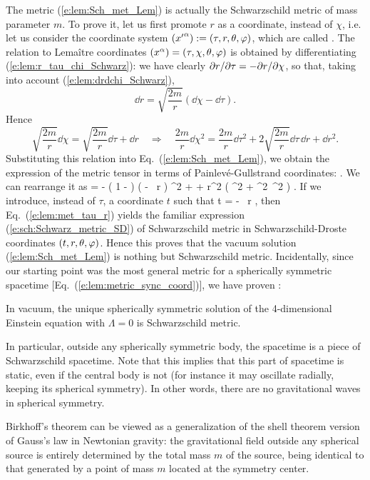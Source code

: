 The metric (\ref{e:lem:Sch_met_Lem}) is actually the
Schwarzschild metric of mass parameter $m$. To prove it, let us first
promote $r$ as a coordinate, instead of $\chi$, i.e. let us consider the
coordinate system $({x'}^\alpha):=(\tau,r,\theta,\varphi)$, which are called
.
The relation to Lemaître coordinates
$({x}^\alpha)=(\tau,\chi,\theta,\varphi)$ is obtained by differentiating (\ref{e:lem:r_tau_chi_Schwarz}):
we have clearly ${\partial r}/{\partial \tau} = - {\partial r}/{\partial \chi}$, so that, taking
into account (\ref{e:lem:drdchi_Schwarz}),
\[
    \dd r =  \sqrt{\frac{2m}{r}} (\dd\chi - \dd\tau) .
\]
Hence
\[
  \sqrt{\frac{2m}{r}}  \dd\chi = \sqrt{\frac{2m}{r}}  \dd\tau + \dd r
\quad \Longrightarrow \quad \frac{2m}{r} \dd\chi^2 = \frac{2m}{r} \dd\tau^2
    + 2 \sqrt{\frac{2m}{r}}  \dd\tau \, \dd r + \dd r^2 .
\]
Substituting this relation into Eq.~(\ref{e:lem:Sch_met_Lem}), we obtain
the expression of the metric tensor in terms of Painlevé-Gullstrand coordinates:
\be \label{e:lem:metric_PG}
    .
\ee
We can rearrange it as
\be
   =  - \left( 1 -  \right) \left( \dd\tau -
         \, \dd r \right) ^2
            + 
            + r^2 \left( \dd\th^2 + \sin^2\th\, \dd\ph^2 \right) .  \label{e:lem:met_tau_r}
\ee
If we introduce, instead of $\tau$, a coordinate $t$ such that
\be \label{e:lem:dt_dtau_dr}
    \dd t = \dd\tau -
         \, \dd r ,
\ee
then
Eq.~(\ref{e:lem:met_tau_r}) yields the familiar expression (\ref{e:sch:Schwarz_metric_SD})
of Schwarzschild metric in Schwarz\-schild-Droste coordinates $(t,r,\theta,\varphi)$.
Hence this proves that
the vacuum solution (\ref{e:lem:Sch_met_Lem}) is nothing but
Schwarzschild metric. Incidentally, since our starting point was
the most general metric for a spherically symmetric spacetime
[Eq.~(\ref{e:lem:metric_sync_coord})], we have proven
:
\begin{greybox}
In vacuum, the unique spherically symmetric solution of the 4-dimensional
Einstein equation with $\Lambda=0$ is Schwarzschild metric.
\end{greybox}
In particular, outside any spherically symmetric body, the spacetime
is a piece of Schwarz\-schild spacetime. Note that this implies that this part of
spacetime is static, even if the central body is not (for instance it may oscillate
radially, keeping its spherical symmetry). In other words, there are no
gravitational waves in spherical symmetry.
\begin{remark}
Birkhoff's theorem can be viewed as a generalization of the shell theorem version
of Gauss's law in Newtonian gravity:
the gravitational field outside any spherical source is entirely determined by the total
mass $m$ of the source, being identical to that generated by a point of mass $m$
located at the symmetry center.
\end{remark}

